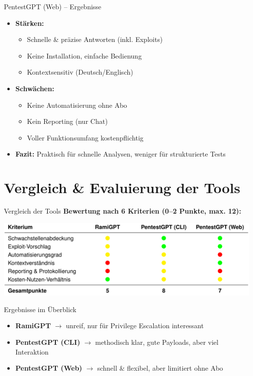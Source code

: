 \documentclass[
	aspectratio=169,	%
	onlytextwidth,		%
	t,					%
	]{beamer}
\begin{document}
\begin{frame}{PentestGPT (Web) – Ergebnisse}
	\begin{itemize}
		\item \textbf{Stärken:}
		\begin{itemize}
			\item Schnelle \& präzise Antworten (inkl. Exploits)
			\item Keine Installation, einfache Bedienung
			\item Kontextsensitiv (Deutsch/Englisch)
		\end{itemize}
		\vspace{2mm}
		\item \textbf{Schwächen:}
		\begin{itemize}
			\item Keine Automatisierung ohne Abo
			\item Kein Reporting (nur Chat)
			\item Voller Funktionsumfang kostenpflichtig
		\end{itemize}
		\vspace{2mm}
		\item \textbf{Fazit:}  
		Praktisch für schnelle Analysen, weniger für strukturierte Tests
	\end{itemize}
\end{frame}



\section{Vergleich \& Evaluierung der Tools}
\begin{frame}{Vergleich der Tools}
	\centering
	\textbf{Bewertung nach 6 Kriterien (0–2 Punkte, max. 12):}
	
	\vspace{5mm}
	\includegraphics[width=\textwidth]{figures/20.png}
	\label{fig:20}
\end{frame}

		
\begin{frame}{Ergebnisse im Überblick}
	\begin{itemize}
		\item \textbf{RamiGPT} $\rightarrow$ unreif, nur für Privilege Escalation interessant
		\item \textbf{PentestGPT (CLI)} $\rightarrow$ methodisch klar, gute Payloads, aber viel Interaktion
		\item \textbf{PentestGPT (Web)} $\rightarrow$ schnell \& flexibel, aber limitiert ohne Abo
	\end{itemize}
\end{frame}
\end{document}
